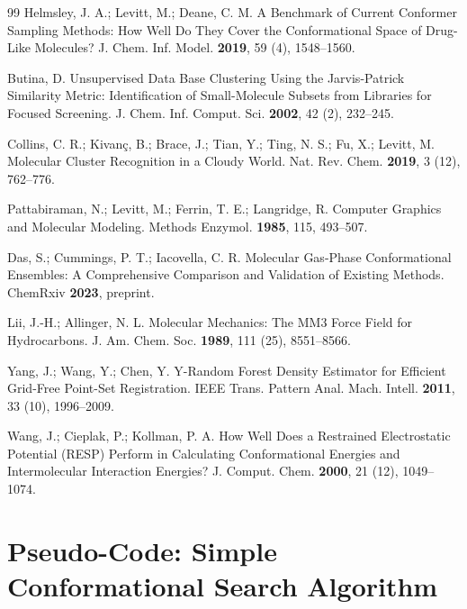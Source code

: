 \documentclass[12pt]{article}
\begin{document}
\begin{thebibliography}{99}
 Helmsley, J. A.; Levitt, M.; Deane, C. M. A Benchmark of Current Conformer Sampling Methods: How Well Do They Cover the Conformational Space of Drug-Like Molecules? J. Chem. Inf. Model. \textbf{2019}, 59 (4), 1548--1560.

 Butina, D. Unsupervised Data Base Clustering Using the Jarvis-Patrick Similarity Metric: Identification of Small-Molecule Subsets from Libraries for Focused Screening. J. Chem. Inf. Comput. Sci. \textbf{2002}, 42 (2), 232--245.

 Collins, C. R.; Kivanç, B.; Brace, J.; Tian, Y.; Ting, N. S.; Fu, X.; Levitt, M. Molecular Cluster Recognition in a Cloudy World. Nat. Rev. Chem. \textbf{2019}, 3 (12), 762--776.

 Pattabiraman, N.; Levitt, M.; Ferrin, T. E.; Langridge, R. Computer Graphics and Molecular Modeling. Methods Enzymol. \textbf{1985}, 115, 493--507.

 Das, S.; Cummings, P. T.; Iacovella, C. R. Molecular Gas-Phase Conformational Ensembles: A Comprehensive Comparison and Validation of Existing Methods. ChemRxiv \textbf{2023}, preprint.

 Lii, J.-H.; Allinger, N. L. Molecular Mechanics: The MM3 Force Field for Hydrocarbons. J. Am. Chem. Soc. \textbf{1989}, 111 (25), 8551--8566.

 Yang, J.; Wang, Y.; Chen, Y. Y-Random Forest Density Estimator for Efficient Grid-Free Point-Set Registration. IEEE Trans. Pattern Anal. Mach. Intell. \textbf{2011}, 33 (10), 1996--2009.

 Wang, J.; Cieplak, P.; Kollman, P. A. How Well Does a Restrained Electrostatic Potential (RESP) Perform in Calculating Conformational Energies and Intermolecular Interaction Energies? J. Comput. Chem. \textbf{2000}, 21 (12), 1049--1074.

\end{thebibliography}

\appendix

\section{Pseudo-Code: Simple Conformational Search Algorithm}
\end{document}

